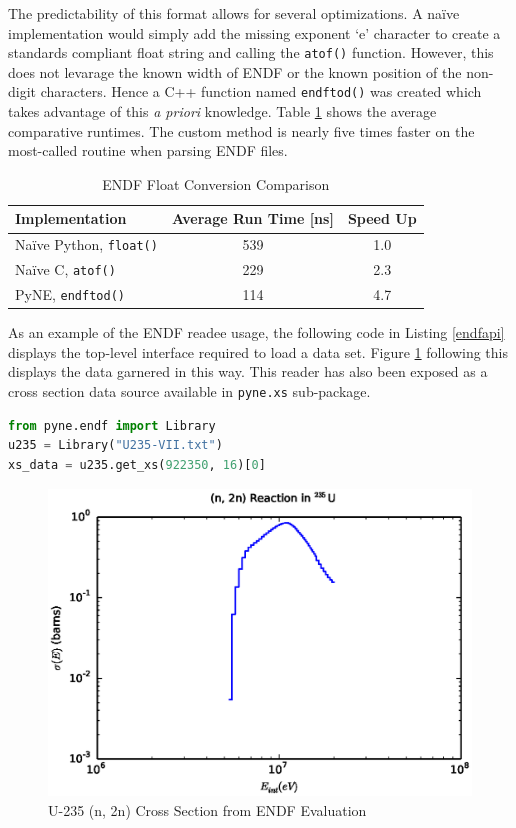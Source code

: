 \documentclass{ansconf}
\begin{document}
The predictability of this format allows for several optimizations.  A na\"{i}ve 
implementation would simply add the missing exponent `e' character to create
a standards compliant float string and calling the \texttt{atof()} function.  
However, this does not levarage the known width of ENDF or the known position of
the non-digit characters.  Hence a C++ function named \texttt{endftod()} was 
created which takes advantage of this \emph{a priori} knowledge.  Table \ref{endftod}
shows the average comparative runtimes. The custom method is nearly 
five times faster on the most-called routine when parsing ENDF files.

\begin{table}
\caption{ENDF Float Conversion Comparison}
\label{endftod}
\begin{center}
\begin{tabular}[htbp]{|l|c|c|}
\hline
\textbf{Implementation} & \textbf{Average Run Time [ns]} & \textbf{Speed Up} \\
\hline
Na\"{i}ve Python, \texttt{float()} & 539 & 1.0 \\
\hline
Na\"{i}ve C, \texttt{atof()} & 229 & 2.3 \\
\hline
PyNE, \texttt{endftod()} & 114 & 4.7 \\
\hline
\end{tabular}
\end{center}
\end{table}

As an example of the ENDF readee usage, the following code in Listing \ref{endfapi} 
displays the top-level interface required to load a data set.  Figure \ref{u235} 
following this displays the data garnered in this way.  This reader has also
been exposed as a cross section data source available in \texttt{pyne.xs} 
sub-package.

\begin{lstlisting}[language=Python,basicstyle=\scriptsize,frame=single,caption=ENDF Reader API,label=endfapi]
from pyne.endf import Library
u235 = Library("U235-VII.txt")
xs_data = u235.get_xs(922350, 16)[0]
\end{lstlisting}

\begin{figure}[htbp]
\begin{center}
\includegraphics{u235_2n.eps}
\end{center}
\caption{U-235 (n, 2n) Cross Section from ENDF Evaluation}
\label{u235}
\end{figure}



\end{document}
